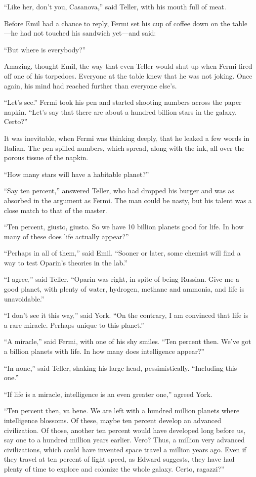 \documentclass[11pt,a4paper]{article}
\begin{document}
“Like her, don’t you, Casanova,” said Teller, with his mouth full of meat.

Before Emil had a chance to reply, Fermi set his cup of coffee down on the table---he had not touched his sandwich yet---and said:

“But where is everybody?”

Amazing, thought Emil, the way that even Teller would shut up when Fermi fired off one of his torpedoes. Everyone at the table knew that he was not joking. Once again, his mind had reached further than everyone else’s.

“Let’s see.” Fermi took his pen and started shooting numbers across the paper napkin. “Let’s say that there are about a hundred billion stars in the galaxy. Certo?”

It was inevitable, when Fermi was thinking deeply, that he leaked a few words in Italian. The pen spilled numbers, which spread, along with the ink, all over the porous tissue of the napkin.

“How many stars will have a habitable planet?”

“Say ten percent,” answered Teller, who had dropped his burger and was as absorbed in the argument as Fermi. The man could be nasty, but his talent was a close match to that of the master.

“Ten percent, giusto, giusto. So we have 10 billion planets good for life. In how many of these does life actually appear?”

“Perhaps in all of them,” said Emil. “Sooner or later, some chemist will find a way to test Oparin’s theories in the lab.”

“I agree,” said Teller. “Oparin was right, in spite of being Russian. Give me a good planet, with plenty of water, hydrogen, methane and ammonia, and life is unavoidable.”

“I don’t see it this way,” said York. “On the contrary, I am convinced that life is a rare miracle. Perhaps unique to this planet.”

“A miracle,” said Fermi, with one of his shy smiles. “Ten percent then. We’ve got a billion planets with life. In how many does intelligence appear?”

“In none,” said Teller, shaking his large head, pessimistically. “Including this one.”

“If life is a miracle, intelligence is an even greater one,” agreed York.

“Ten percent then, va bene. We are left with a hundred million planets where intelligence blossoms. Of these, maybe ten percent develop an advanced civilization. Of those, another ten percent would have developed long before us, say one to a hundred million years earlier. Vero? Thus, a million very advanced civilizations, which could have invented space travel a million years ago. Even if they travel at ten percent of light speed, as Edward suggests, they have had plenty of time to explore and colonize the whole galaxy. Certo, ragazzi?”
\end{document}
